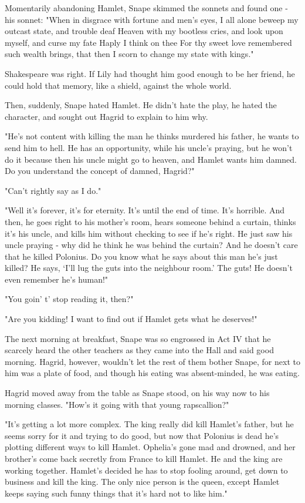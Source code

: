 Momentarily abandoning Hamlet, Snape skimmed the sonnets and found one - his sonnet: "When in disgrace with fortune and men's eyes, I all alone beweep my outcast state, and trouble deaf Heaven with my bootless cries, and look upon myself, and curse my fate{\el} Haply I think on thee{\el} For thy sweet love remembered such wealth brings, that then I scorn to change my state with kings."

Shakespeare was right. If Lily had thought him good enough to be her friend, he could hold that memory, like a shield, against the whole world.

Then, suddenly, Snape hated Hamlet. He didn't hate the play, he hated the character, and sought out Hagrid to explain to him why.

"He's not content with killing the man he thinks murdered his father, he wants to send him to hell. He has an opportunity, while his uncle's praying, but he won't do it because then his uncle might go to heaven, and Hamlet wants him damned. Do you understand the concept of damned, Hagrid?"

"Can't rightly say as I do."

"Well it's forever, it's for eternity. It's until the end of time. It's horrible. And then, he goes right to his mother's room, hears someone behind a curtain, thinks it's his uncle, and kills him without checking to see if he's right. He just saw his uncle praying - why did he think he was behind the curtain? And he doesn't care that he killed Polonius. Do you know what he says about this man he's just killed? He says, `I'll lug the guts into the neighbour room.' The guts! He doesn't even remember he's human!"

"You goin' t' stop reading it, then?"

"Are you kidding! I want to find out if Hamlet gets what he deserves!"

The next morning at breakfast, Snape was so engrossed in Act IV that he scarcely heard the other teachers as they came into the Hall and said good morning. Hagrid, however, wouldn't let the rest of them bother Snape, for next to him was a plate of food, and though his eating was absent-minded, he was eating.

Hagrid moved away from the table as Snape stood, on his way now to his morning classes. "How's it going with that young rapscallion?"

"It's getting a lot more complex. The king really did kill Hamlet's father, but he seems sorry for it and trying to do good, but now that Polonius is dead he's plotting different ways to kill Hamlet. Ophelia's gone mad and drowned, and her brother's come back secretly from France to kill Hamlet. He and the king are working together. Hamlet's decided he has to stop fooling around, get down to business and kill the king. The only nice person is the queen, except Hamlet keeps saying such funny things that it's hard not to like him."

